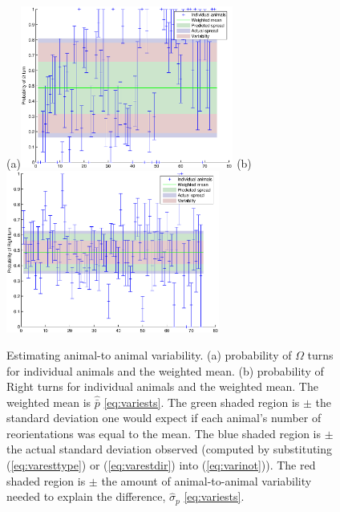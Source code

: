 \documentclass[12pt]{article}
\begin{document}
\begin{figure}
  (a)\includegraphics[width=7cm]{TypeProbs_individual.eps}
  (b)\includegraphics[width=7cm]{DirProbs_individual.eps}
  \caption[Estimating animal-to animal variability.]{Estimating animal-to animal variability. (a) probability of $\Omega$ turns for individual animals and the weighted mean. (b) probability of Right turns for individual animals and the weighted mean. The weighted mean is $\hat{\bar{p}}$ \eqref{eq:variests}.
  The green shaded region is $\pm$ the standard deviation one would expect if each animal's number of reorientations was equal to the mean.
  The blue shaded region is $\pm$ the actual standard deviation observed (computed by substituting (\ref{eq:varesttype}) or (\ref{eq:varestdir}) into (\ref{eq:varinot})).
  The red shaded region is $\pm$ the amount of animal-to-animal variability needed to explain the difference, $\hat{\sigma}_p$ \eqref{eq:variests}. }\label{fig:variability}
\end{figure}
\end{document}
